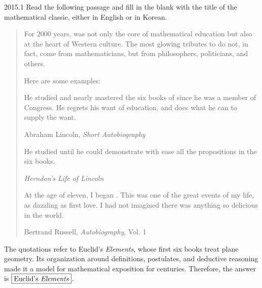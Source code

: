     \begin{pastproblem}{2015.1}
        Read the following passage and fill in the blank with the title of the mathematical classic,
        either in English or in Korean.

        \begin{quote}
            For $2000$ years, \underline{\hspace{2cm}} was not only the core of mathematical
            education but also at the heart of Western culture. The most glowing tributes to
            \underline{\hspace{2cm}} do not, in fact, come from mathematicians, but from
            philosophers, politicians, and others.

            Here are some examples:
            \begin{problemchoices}
                \item He studied and nearly mastered the six books of \underline{\hspace{2cm}}
                      since he was a member of Congress. He regrets his want of education, and does
                      what he can to supply the want.

                      \hfill Abraham Lincoln, \textit{Short Autobiography}

                \item He studied \underline{\hspace{2cm}} until he could demonstrate with ease
                      all the propositions in the six books.

                      \hfill \textit{Herndon's Life of Lincoln}

                \item At the age of eleven, I began \underline{\hspace{2cm}}. This was one of
                      the great events of my life, as dazzling as first love. I had not imagined
                      there was anything so delicious in the world.

                      \hfill Bertrand Russell, \textit{Autobiography}, Vol. 1
            \end{problemchoices}
        \end{quote}
    \end{pastproblem}

    \begin{solution}
The quotations refer to Euclid's \textit{Elements}, whose first six
        books treat plane geometry. Its organization around definitions,
        postulates, and deductive reasoning made it a model for mathematical
        exposition for centuries.
        Therefore, the answer is $\boxed{\text{Euclid's \textit{Elements}}}$.
    \end{solution}

